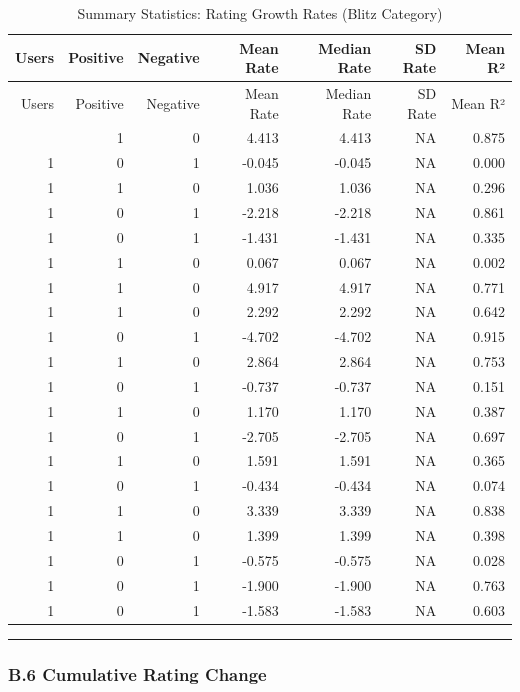 \documentclass[
]{article}
\begin{document}
\begin{longtable}[]{@{}rrrrrrr@{}}
\caption{Summary Statistics: Rating Growth Rates (Blitz
Category)}\tabularnewline
\toprule\noalign{}
Users & Positive & Negative & Mean Rate & Median Rate & SD Rate & Mean
R² \\
\midrule\noalign{}
\endfirsthead
\toprule\noalign{}
Users & Positive & Negative & Mean Rate & Median Rate & SD Rate & Mean
R² \\
\midrule\noalign{}
\endhead
\bottomrule\noalign{}
\endlastfoot
1 & 1 & 0 & 4.413 & 4.413 & NA & 0.875 \\
1 & 0 & 1 & -0.045 & -0.045 & NA & 0.000 \\
1 & 1 & 0 & 1.036 & 1.036 & NA & 0.296 \\
1 & 0 & 1 & -2.218 & -2.218 & NA & 0.861 \\
1 & 0 & 1 & -1.431 & -1.431 & NA & 0.335 \\
1 & 1 & 0 & 0.067 & 0.067 & NA & 0.002 \\
1 & 1 & 0 & 4.917 & 4.917 & NA & 0.771 \\
1 & 1 & 0 & 2.292 & 2.292 & NA & 0.642 \\
1 & 0 & 1 & -4.702 & -4.702 & NA & 0.915 \\
1 & 1 & 0 & 2.864 & 2.864 & NA & 0.753 \\
1 & 0 & 1 & -0.737 & -0.737 & NA & 0.151 \\
1 & 1 & 0 & 1.170 & 1.170 & NA & 0.387 \\
1 & 0 & 1 & -2.705 & -2.705 & NA & 0.697 \\
1 & 1 & 0 & 1.591 & 1.591 & NA & 0.365 \\
1 & 0 & 1 & -0.434 & -0.434 & NA & 0.074 \\
1 & 1 & 0 & 3.339 & 3.339 & NA & 0.838 \\
1 & 1 & 0 & 1.399 & 1.399 & NA & 0.398 \\
1 & 0 & 1 & -0.575 & -0.575 & NA & 0.028 \\
1 & 0 & 1 & -1.900 & -1.900 & NA & 0.763 \\
1 & 0 & 1 & -1.583 & -1.583 & NA & 0.603 \\
\end{longtable}

\begin{center}\rule{0.5\linewidth}{0.5pt}\end{center}

\subsubsection{B.6 Cumulative Rating
Change}\label{b.6-cumulative-rating-change}
\end{document}
